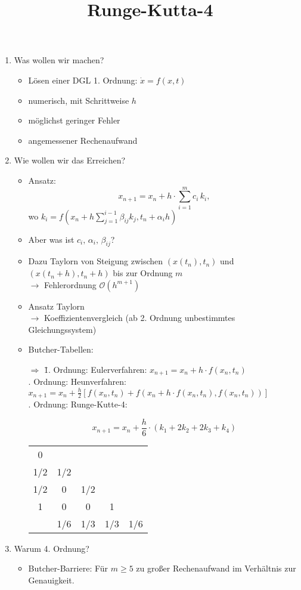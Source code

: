 \documentclass[]{scrartcl}
\begin{document}
\title{Runge-Kutta-4}
\maketitle

\begin{enumerate}
	\item Was wollen wir machen?
	\begin{itemize}
		\item Lösen einer DGL 1. Ordnung: $\dot{x}=f(x,t)$
		\item numerisch, mit Schrittweise $h$
		\item möglichst geringer Fehler
		\item angemessener Rechenaufwand
	\end{itemize}
	\item Wie wollen wir das Erreichen?
	\begin{itemize}
		\item Ansatz:\begin{equation}
			x_{n+1}= x_n+h\cdot\sum_{i=1}^{m}c_i\,k_i,
		\end{equation}
		wo $k_i=f(x_n+h\sum_{j=1}^{i-1}\beta_{ij}k_j,t_n+\alpha_ih)$
		\item Aber was ist $c_i,\,\alpha_i,\,\beta_{ij}$?
		\item Dazu Taylorn von Steigung zwischen $(x(t_n),t_n)$ und $(x(t_n+h),t_n+h)$ bis zur Ordnung $m$\\
		$\rightarrow$ Fehlerordnung $\mathcal{O}(h^{m+1})$
		\item Ansatz Taylorn\\
		$\rightarrow$ Koeffizientenvergleich (ab 2. Ordnung unbestimmtes Gleichungssystem)
		\item Butcher-Tabellen:
		\begin{tabbing}
			\quad$\Rightarrow$ \=1. Ordnung: Eulerverfahren: $x_{n+1}=x_n+h\cdot f(x_n, t_n)$\\
			. Ordnung: Heunverfahren: $x_{n+1}=x_n+\frac{h}{2}\left[f(x_n,t_n)+f(x_n+h\cdot f(x_n,t_n),f(x_n,t_n))\right]$\\
			. Ordnung: Runge-Kutte-4:
		\end{tabbing}
		\begin{equation}
			x_{n+1}=x_n+\frac{h}{6}\cdot (k_1+2k_2+2k_3+k_4)
		\end{equation} 
	\begin{center}
		\begin{tabular}{c|cccc}
			0&&&&\\
			1/2&1/2&&&\\
			1/2&0&1/2&&\\
			1&0&0&1&\\ \hline
			&1/6&1/3&1/3&1/6
		\end{tabular}
	\end{center}	
	\end{itemize}
	\item Warum 4. Ordnung?
	\begin{itemize}
		\item Butcher-Barriere: Für $m\geq 5$ zu großer Rechenaufwand im Verhältnis zur Genauigkeit.
	\end{itemize}
\end{enumerate}
\end{document}
